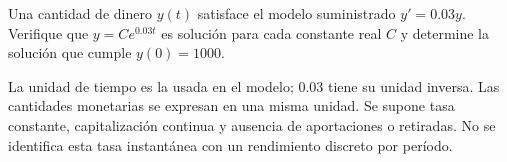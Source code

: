 Una cantidad de dinero $y(t)$ satisface el modelo suministrado $y'=0.03y$. Verifique que $y=Ce^{0.03t}$ es solución para cada constante real $C$ y determine la solución que cumple $y(0)=1000$.

La unidad de tiempo es la usada en el modelo; $0.03$ tiene su unidad inversa. Las cantidades monetarias se expresan en una misma unidad. Se supone tasa constante, capitalización continua y ausencia de aportaciones o retiradas. No se identifica esta tasa instantánea con un rendimiento discreto por período.
